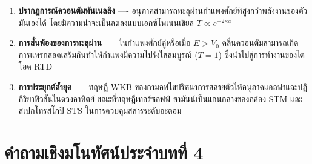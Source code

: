 \begin{enumerate}
    \item \textbf{ปรากฏการณ์ควอนตัมทันเนลลิง} ---- อนุภาคสามารถทะลุผ่านกำแพงศักย์ที่สูงกว่าพลังงานของตัวมันเองได้ โดยมีความน่าจะเป็นลดลงแบบเอกซ์โพเนนเชียล $T \propto e^{-2\kappa a}$
    
    \item \textbf{การสั่นพ้องของการทะลุผ่าน} ---- ในกำแพงศักย์คู่หรือเมื่อ $E > V_0$ คลื่นควอนตัมสามารถเกิดการแทรกสอดเสริมกันทำให้กำแพงมีความโปร่งใสสมบูรณ์ ($T=1$) ซึ่งนำไปสู่การทำงานของไดโอด RTD
    
    \item \textbf{การประยุกต์ล้ำยุค} ---- ทฤษฎี WKB ของกามอฟไขปริศนาการสลายตัวให้อนุภาคแอลฟาและปฏิกิริยาฟิวชันในดวงอาทิตย์ ขณะที่ทฤษฎีเทอร์ซอฟฟ์-ฮามันน์เป็นแกนกลางของกล้อง STM และสเปกโทรสโกปี STS ในการควบคุมสสารระดับอะตอม
\end{enumerate}

\section{คำถามเชิงมโนทัศน์ประจำบทที่ 4}
\label{sec_conceptual_questions_ch04}

